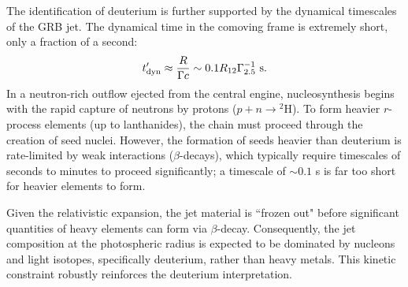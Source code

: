 \documentclass[prd,twocolumn,amsmath,amssymb,aps,linenumbers]{revtex4-2} %
\begin{document}
The identification of deuterium is further supported by the dynamical timescales of the GRB jet. %
The dynamical time in the comoving frame is extremely short, only a fraction of a second:
\begin{equation}
t'_{\rm dyn} \approx \frac{R}{\Gamma c} \sim 0.1 R_{12} \Gamma_{2.5}^{-1} \text{ s}.
\end{equation}
In a neutron-rich outflow ejected from the central engine, nucleosynthesis begins with the rapid capture of neutrons by protons ($p + n \rightarrow {^2\text{H}}$). To form heavier $r$-process elements (up to lanthanides), the chain must proceed through the creation of seed nuclei. However, the formation of seeds heavier than deuterium is rate-limited by weak interactions ($\beta$-decays), which typically require timescales of seconds to minutes to proceed significantly; a timescale of $\sim0.1$ s is far too short for heavier elements to form. %

Given the relativistic expansion, the jet material is ``frozen out" before significant quantities of heavy elements can form via $\beta$-decay. Consequently, the jet composition at the photospheric radius is expected to be dominated by nucleons and light isotopes, specifically deuterium, rather than heavy metals. This kinetic constraint robustly %
reinforces the deuterium interpretation.
\end{document}
